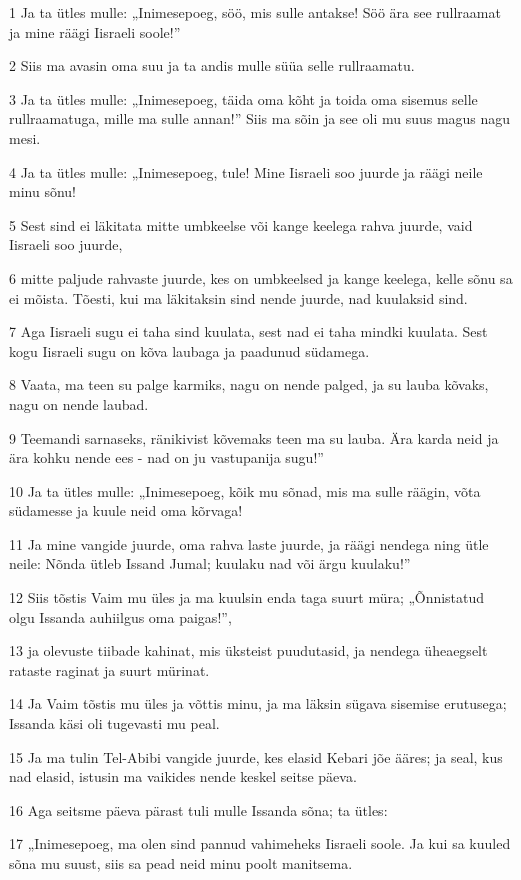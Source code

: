 \par 1 Ja ta ütles mulle: „Inimesepoeg, söö, mis sulle antakse! Söö ära see rullraamat ja mine räägi Iisraeli soole!”
\par 2 Siis ma avasin oma suu ja ta andis mulle süüa selle rullraamatu.
\par 3 Ja ta ütles mulle: „Inimesepoeg, täida oma kõht ja toida oma sisemus selle rullraamatuga, mille ma sulle annan!” Siis ma sõin ja see oli mu suus magus nagu mesi.
\par 4 Ja ta ütles mulle: „Inimesepoeg, tule! Mine Iisraeli soo juurde ja räägi neile minu sõnu!
\par 5 Sest sind ei läkitata mitte umbkeelse või kange keelega rahva juurde, vaid Iisraeli soo juurde,
\par 6 mitte paljude rahvaste juurde, kes on umbkeelsed ja kange keelega, kelle sõnu sa ei mõista. Tõesti, kui ma läkitaksin sind nende juurde, nad kuulaksid sind.
\par 7 Aga Iisraeli sugu ei taha sind kuulata, sest nad ei taha mindki kuulata. Sest kogu Iisraeli sugu on kõva laubaga ja paadunud südamega.
\par 8 Vaata, ma teen su palge karmiks, nagu on nende palged, ja su lauba kõvaks, nagu on nende laubad.
\par 9 Teemandi sarnaseks, ränikivist kõvemaks teen ma su lauba. Ära karda neid ja ära kohku nende ees - nad on ju vastupanija sugu!”
\par 10 Ja ta ütles mulle: „Inimesepoeg, kõik mu sõnad, mis ma sulle räägin, võta südamesse ja kuule neid oma kõrvaga!
\par 11 Ja mine vangide juurde, oma rahva laste juurde, ja räägi nendega ning ütle neile: Nõnda ütleb Issand Jumal; kuulaku nad või ärgu kuulaku!”
\par 12 Siis tõstis Vaim mu üles ja ma kuulsin enda taga suurt müra; „Õnnistatud olgu Issanda auhiilgus oma paigas!”,
\par 13 ja olevuste tiibade kahinat, mis üksteist puudutasid, ja nendega üheaegselt rataste raginat ja suurt mürinat.
\par 14 Ja Vaim tõstis mu üles ja võttis minu, ja ma läksin sügava sisemise erutusega; Issanda käsi oli tugevasti mu peal.
\par 15 Ja ma tulin Tel-Abibi vangide juurde, kes elasid Kebari jõe ääres; ja seal, kus nad elasid, istusin ma vaikides nende keskel seitse päeva.
\par 16 Aga seitsme päeva pärast tuli mulle Issanda sõna; ta ütles:
\par 17 „Inimesepoeg, ma olen sind pannud vahimeheks Iisraeli soole. Ja kui sa kuuled sõna mu suust, siis sa pead neid minu poolt manitsema.
